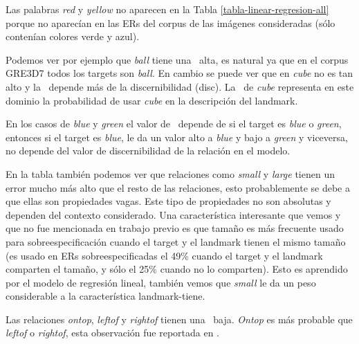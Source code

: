 Las palabras {\it red} y {\it yellow} no aparecen en la Tabla \ref{tabla-linear-regresion-all} porque no aparec\'ian en las ERs del corpus de las im\'agenes consideradas (s\'olo conten\'ian colores verde y azul).

Podemos ver por ejemplo que {\it ball} tiene una \puse\ alta, es natural ya que en el corpus GRE3D7 todos los targets son {\it ball}. En cambio se puede ver que en {\it cube} no es tan alto y la \puse\ depende m\'as de la discernibilidad (disc). La \puse\ de {\it cube} representa en este dominio la probabilidad de usar {\it cube} en la descripci\'on del landmark. 

En los casos de {\it blue} y {\it green} el valor de \puse\ depende de si el target es {\it blue} o {\it green}, entonces si el target es {\it blue}, le da un valor alto a {\it blue} y bajo a {\it green} y viceversa, no depende del valor de discernibilidad de la relaci\'on en el modelo. 

En la tabla tambi\'en podemos ver que relaciones como {\it small} y {\it large} tienen un error mucho m\'as alto que el resto de las relaciones, esto probablemente se debe a que ellas son propiedades vagas. Este tipo de propiedades no son absolutas y dependen del contexto considerado. Una caracter\'istica interesante que vemos y que no fue mencionada en trabajo previo es que tama\~no es m\'as frecuente usado para sobreespecificaci\'on cuando el target y el landmark tienen el mismo tama\~no 
(es usado en ERs sobreespecificadas el 49\% cuando el target y el landmark comparten el tama\~no, y s\'olo el 25\% cuando no lo comparten). Esto es aprendido por el modelo de regresi\'on lineal, tambi\'en vemos que {\it small} le da un peso considerable a la caracter\'istica landmark-tiene.

Las relaciones {\it ontop}, {\it leftof} y {\it rightof} tienen una \puse\ baja. {\it Ontop} es m\'as probable que {\it leftof} o {\it rightof}, esta observaci\'on fue reportada en \cite{viethendaleguhe11}. 

